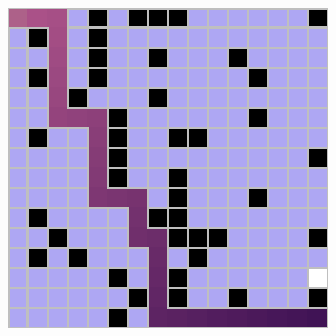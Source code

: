\documentclass[letter]{article}
\begin{document}
\begin{questions}
\begin{figure}
		\caption{}\label{fig:q2-14}
		\endminipage\hfill
		\includegraphics[width=\linewidth]{../pics/16/BFS 113708 31 27898.png}
		\caption{}\label{fig:q2-15}
		\endminipage
	\end{figure}


\end{questions}
\end{document}
